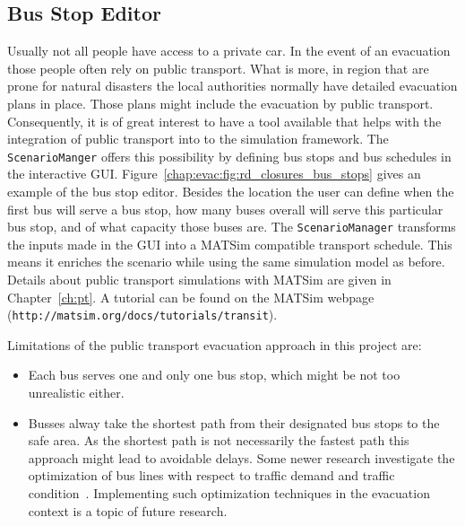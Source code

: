 \subsection{Bus Stop Editor}
Usually not all people have access to a private car. In the event of an evacuation those people often rely on public transport. What is more, in region that are prone for natural disasters the local authorities normally have detailed evacuation plans in place. Those plans might include the evacuation by public transport. Consequently, it is of great interest to have a tool available that helps with the integration of public transport into to the simulation framework. The \verb+ScenarioManger+ offers this possibility by defining bus stops and bus schedules in the interactive GUI. Figure~\ref{chap:evac:fig:rd_closures_bus_stops} gives an example of the bus stop editor. Besides the location the user can define when the first bus will serve a bus stop, how many buses overall will serve this particular bus stop, and of what capacity those buses are. 
The \verb+ScenarioManager+ transforms the inputs made in the GUI into a MATSim compatible transport schedule. This means it enriches the scenario while using the same simulation model as before. Details about public transport simulations with MATSim are given in Chapter~\ref{ch:pt}. A tutorial can be found on the MATSim webpage (\verb+http://matsim.org/docs/tutorials/transit+).

Limitations of the public transport evacuation approach in this project are:
\begin{itemize}
\item Each bus serves one and only one bus stop, which might be not too unrealistic either.
\item Busses alway take the shortest path from their designated bus stops to the safe area. As the shortest path is not necessarily the fastest path this approach might lead to avoidable delays. Some newer research investigate the optimization of bus lines with respect to traffic demand and traffic condition~\citep{Neumann_PhDThesis_2014}. Implementing such optimization techniques in the evacuation context is a topic of future research.
\end{itemize}

